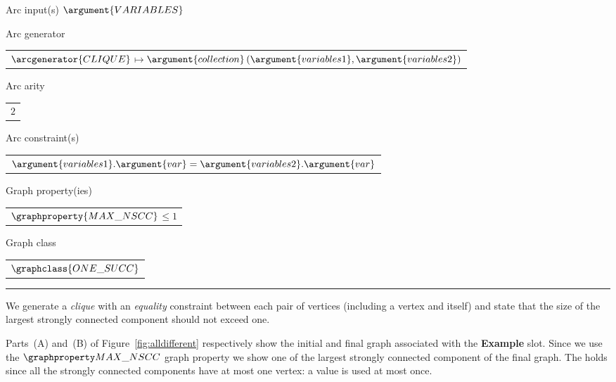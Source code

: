\begin{ctrdesc}
 \clearpage
\colorbox{MyAzurelight}{\begin{minipage}[t]{11.2cm}
\colorbox{MyAzurelight}{\begin{minipage}[t]{11.2cm}
\item[Arc input(s)]
\hypertarget{CalldifferentPgraph}{}
$\argument{VARIABLES}$
\item[Arc generator]
\begin{tabular}[t]{l}
$ $\hyperlink{AG_CLIQUE}{$\arcgenerator{CLIQUE}$}$ \mapsto  $\hyperlink{DT_collection}{$\argument{collection}$}$ (\argument{variables1},\argument{variables2})$\\
\end{tabular}
\item[Arc arity]
\begin{tabular}[t]{l}
$2$\\
\end{tabular}
\item[Arc constraint(s)]
\begin{tabular}[t]{l}
$\argument{variables1}.\argument{var}=\argument{variables2}.\argument{var}$\\
\end{tabular}
\item[Graph property(ies)]
\begin{tabular}[t]{l}
$ $\hyperlink{GC_MAX_NSCC}{$\graphproperty{MAX\_NSCC}$}$ \leq 1$\\
\end{tabular}
\item[Graph class]
\begin{tabular}[t]{l}
$ $\hyperlink{GC_ONE_SUCC}{$\graphclass{ONE\_SUCC}$}$ $\\
\end{tabular}
\hrule

\end{minipage}}

\end{minipage}}
\item[\pdfmarkup{subject={Graph model},color=white,markup=Highlight}{Graph model}{Explicit description in terms of graph property of the meaning of the constraint.}]
We generate a \emph{clique} with an \emph{equality} constraint
between each pair of vertices (including a vertex and itself) and
state that the size of the largest strongly connected component should
not exceed one.

Parts~(A) and~(B) of Figure~\ref{fig:alldifferent} respectively show the initial and final graph
associated with the {\bf Example} slot.
Since we use the \hyperlink{GC_MAX_NSCC}{$\MMAXNSCC$} graph property we show one
of the largest strongly connected component of the final graph.
The  holds since all the strongly connected
components have at most one vertex: a value is used at most once.


\end{ctrdesc}
